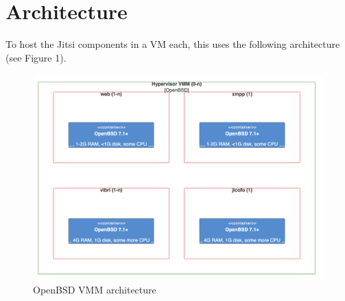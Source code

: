 \documentclass[conference]{IEEEtran}
\begin{document}
\section{Architecture}
To host the Jitsi components in a VM each, this uses the following architecture (see Figure 1).
\begin{figure}
    \centering
    \includegraphics[width=16cm]{img/arch-openbsd.png}
    \caption{\textsf{OpenBSD VMM architecture}}
\end{figure}
\end{document}
